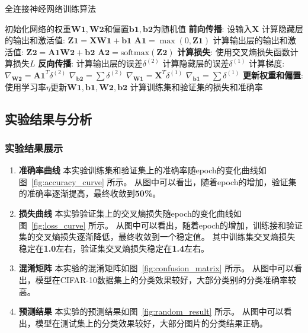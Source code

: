 \documentclass[12pt]{article}
\begin{document}
\begin{algorithm}
  \caption{全连接神经网络训练算法}
  \label{FullyConnectedNN Training Algorithm}
  \begin{algorithmic}[1]
    \State 初始化网络的权重$\mathbf{W1}, \mathbf{W2}$和偏置$\mathbf{b1}, \mathbf{b2}$为随机值
    \State \textbf{前向传播}:
    \State \quad 设输入$\mathbf{X}$
    \State \quad 计算隐藏层的输出和激活值:
    \State \quad \quad $\mathbf{Z1} = \mathbf{X} \mathbf{W1} + \mathbf{b1}$
    \State \quad \quad $\mathbf{A1} = \max(0, \mathbf{Z1})$ 
    \State \quad 计算输出层的输出和激活值:
    \State \quad \quad $\mathbf{Z2} = \mathbf{A1} \mathbf{W2} + \mathbf{b2}$
    \State \quad \quad $\mathbf{A2} = \text{softmax}(\mathbf{Z2})$
    \State \textbf{计算损失}:
    \State \quad 使用交叉熵损失函数计算损失$L$
    \State \textbf{反向传播}:
    \State \quad 计算输出层的误差$\delta^{(2)}$
    \State \quad 计算隐藏层的误差$\delta^{(1)}$
    \State \quad 计算梯度:
    \State \quad \quad $\nabla_{\mathbf{W2}} = \mathbf{A1}^T \delta^{(2)}$
    \State \quad \quad $\nabla_{\mathbf{b2}} = \sum \delta^{(2)}$
    \State \quad \quad $\nabla_{\mathbf{W1}} = \mathbf{X}^T \delta^{(1)}$
    \State \quad \quad $\nabla_{\mathbf{b1}} = \sum \delta^{(1)}$
    \State \textbf{更新权重和偏置}:
    \State \quad 使用学习率$\eta$更新$\mathbf{W1}, \mathbf{b1}, \mathbf{W2}, \mathbf{b2}$
    \EndFor
    \State 计算训练集和验证集的损失和准确率
    \EndFor
    \EndProcedure
  \end{algorithmic}
\end{algorithm}

\subsection{实验结果与分析}

\subsubsection{实验结果展示}

\begin{enumerate}
  \item \textbf{准确率曲线} 本实验训练集和验证集上的准确率随epoch的变化曲线如图~\ref{fig:accuracy_curve} 所示。
        从图中可以看出，随着epoch的增加，验证集的准确率逐渐提高，最终收敛到\textbf{50\%}。
  \item \textbf{损失曲线} 本实验验证集上的交叉熵损失随epoch的变化曲线如图~\ref{fig:loss_curve} 所示。
        从图中可以看出，随着epoch的增加，训练接和验证集的交叉熵损失逐渐降低，最终收敛到一个稳定值。
        其中训练集交叉熵损失稳定在\textbf{1.0}左右，验证集交叉熵损失稳定在\textbf{1.4}左右。
  \item \textbf{混淆矩阵} 本实验的混淆矩阵如图~\ref{fig:confusion_matrix} 所示。
        从图中可以看出，模型在CIFAR-10数据集上的分类效果较好，大部分类别的分类准确率较高。
  \item \textbf{预测结果} 本实验的预测结果如图~\ref{fig:random_result} 所示。
        从图中可以看出，模型在测试集上的分类效果较好，大部分图片的分类结果正确。
\end{enumerate}
\end{document}
